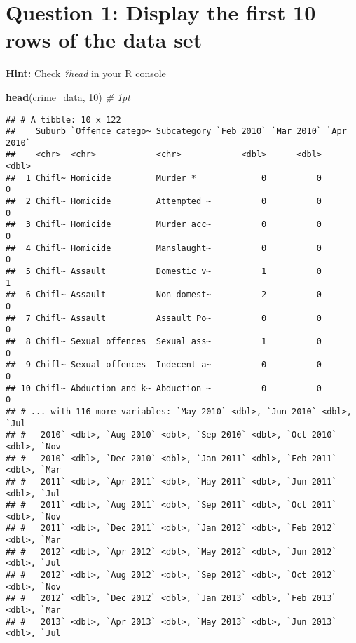 \documentclass[
]{article}
\newenvironment{Shaded}{\begin{snugshade}}{\end{snugshade}}
\newcommand{\CommentTok}[1]{\textcolor[rgb]{0.56,0.35,0.01}{\textit{#1}}}
\newcommand{\DecValTok}[1]{\textcolor[rgb]{0.00,0.00,0.81}{#1}}
\newcommand{\KeywordTok}[1]{\textcolor[rgb]{0.13,0.29,0.53}{\textbf{#1}}}
\newcommand{\NormalTok}[1]{#1}
\begin{document}
\hypertarget{question-1-display-the-first-10-rows-of-the-data-set}{%
\section{Question 1: Display the first 10 rows of the data
set}\label{question-1-display-the-first-10-rows-of-the-data-set}}

\textbf{Hint:} Check \emph{?head} in your R console

\begin{Shaded}
\begin{Highlighting}[]
\KeywordTok{head}\NormalTok{(crime_data, }\DecValTok{10}\NormalTok{)   }\CommentTok{# 1pt}
\end{Highlighting}
\end{Shaded}

\begin{verbatim}
## # A tibble: 10 x 122
##    Suburb `Offence catego~ Subcategory `Feb 2010` `Mar 2010` `Apr 2010`
##    <chr>  <chr>            <chr>            <dbl>      <dbl>      <dbl>
##  1 Chifl~ Homicide         Murder *             0          0          0
##  2 Chifl~ Homicide         Attempted ~          0          0          0
##  3 Chifl~ Homicide         Murder acc~          0          0          0
##  4 Chifl~ Homicide         Manslaught~          0          0          0
##  5 Chifl~ Assault          Domestic v~          1          0          1
##  6 Chifl~ Assault          Non-domest~          2          0          0
##  7 Chifl~ Assault          Assault Po~          0          0          0
##  8 Chifl~ Sexual offences  Sexual ass~          1          0          0
##  9 Chifl~ Sexual offences  Indecent a~          0          0          0
## 10 Chifl~ Abduction and k~ Abduction ~          0          0          0
## # ... with 116 more variables: `May 2010` <dbl>, `Jun 2010` <dbl>, `Jul
## #   2010` <dbl>, `Aug 2010` <dbl>, `Sep 2010` <dbl>, `Oct 2010` <dbl>, `Nov
## #   2010` <dbl>, `Dec 2010` <dbl>, `Jan 2011` <dbl>, `Feb 2011` <dbl>, `Mar
## #   2011` <dbl>, `Apr 2011` <dbl>, `May 2011` <dbl>, `Jun 2011` <dbl>, `Jul
## #   2011` <dbl>, `Aug 2011` <dbl>, `Sep 2011` <dbl>, `Oct 2011` <dbl>, `Nov
## #   2011` <dbl>, `Dec 2011` <dbl>, `Jan 2012` <dbl>, `Feb 2012` <dbl>, `Mar
## #   2012` <dbl>, `Apr 2012` <dbl>, `May 2012` <dbl>, `Jun 2012` <dbl>, `Jul
## #   2012` <dbl>, `Aug 2012` <dbl>, `Sep 2012` <dbl>, `Oct 2012` <dbl>, `Nov
## #   2012` <dbl>, `Dec 2012` <dbl>, `Jan 2013` <dbl>, `Feb 2013` <dbl>, `Mar
## #   2013` <dbl>, `Apr 2013` <dbl>, `May 2013` <dbl>, `Jun 2013` <dbl>, `Jul

\end{verbatim}
\end{document}
